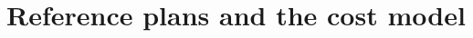 \documentclass[11pt]{article}
\begin{document}
\section{Reference plans and the cost model}




\appendix

\end{document}
